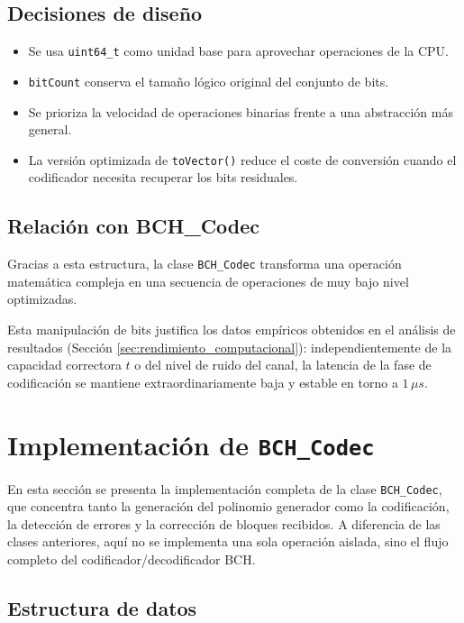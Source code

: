 \subsection{Decisiones de diseño}

\begin{itemize}
    \item Se usa \texttt{uint64\_t} como unidad base para aprovechar operaciones de la CPU.
    \item \texttt{bitCount} conserva el tamaño lógico original del conjunto de bits.
    \item Se prioriza la velocidad de operaciones binarias frente a una abstracción más general.
    \item La versión optimizada de \texttt{toVector()} reduce el coste de conversión cuando el codificador necesita recuperar los bits residuales.
\end{itemize}

\subsection{Relación con BCH\_Codec}

Gracias a esta estructura, la clase \texttt{BCH\_Codec} transforma una operación matemática compleja en una secuencia de operaciones de muy bajo nivel optimizadas. 

Esta manipulación de bits justifica los datos empíricos obtenidos en el análisis de resultados (Sección \ref{sec:rendimiento_computacional}): independientemente de la capacidad correctora $t$ o del nivel de ruido del canal, la latencia de la fase de codificación se mantiene extraordinariamente baja y estable en torno a $1\,\mu s$.
\section{Implementación de \texttt{BCH\_Codec}}
\label{sec:bch_codec}

En esta sección se presenta la implementación completa de la clase \texttt{BCH\_Codec}, que concentra tanto la generación del polinomio generador como la codificación, la detección de errores y la corrección de bloques recibidos. A diferencia de las clases anteriores, aquí no se implementa una sola operación aislada, sino el flujo completo del codificador/decodificador BCH.

\subsection{Estructura de datos}

